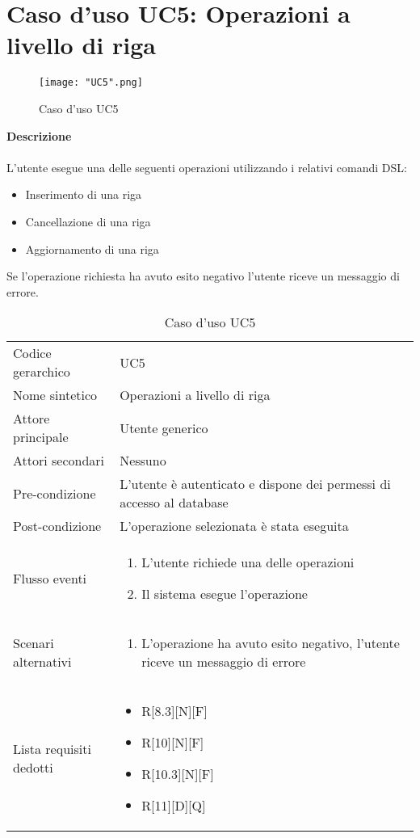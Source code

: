 \documentclass[a4paper]{report}
\begin{document}
	 \section{Caso d'uso UC5: Operazioni a livello di riga}
	 \begin{figure}[H]
			\centering
			\texttt{[image: "UC5".png]}
			\caption{Caso d'uso UC5}
		\end{figure}
	 \textbf{Descrizione} \\ \\
	 L'utente esegue una delle seguenti operazioni utilizzando i relativi comandi DSL:
	 \begin{itemize}
	 	\item Inserimento di una riga
	 	\item Cancellazione di una riga
	 	\item Aggiornamento di una riga
	 \end{itemize}
	 Se l'operazione richiesta ha avuto esito negativo l'utente riceve un messaggio di errore.
		\begin{table}[H]
		\begin{tabularx}{\textwidth}{X | X}\toprule
			\rowcolor{orange!65}Codice gerarchico & UC5\\
			Nome sintetico & Operazioni a livello di riga\\
			\rowcolor{orange!65}Attore principale & Utente generico\\
			Attori secondari & Nessuno \\
			\rowcolor{orange!65}Pre-condizione & L'utente è autenticato e dispone dei permessi di accesso
			al database\\
			Post-condizione & L'operazione selezionata è stata eseguita\\
			\rowcolor{orange!65}Flusso eventi & \begin{enumerate}
			\item L'utente richiede una delle operazioni
			\item Il sistema esegue l'operazione
			\end{enumerate} \\
			Scenari alternativi & \begin{enumerate}
			\item L'operazione ha avuto esito negativo, l'utente riceve un messaggio di errore
			\end{enumerate} \\
			\rowcolor{orange!65}Lista requisiti dedotti & \begin{itemize}
				\item R[8.3][N][F]
				\item R[10][N][F]
				\item R[10.3][N][F]
				\item R[11][D][Q]
				\end{itemize} \\
			\bottomrule
		\end{tabularx}
		\caption{Caso d'uso UC5}
	 \end{table}
\end{document}
